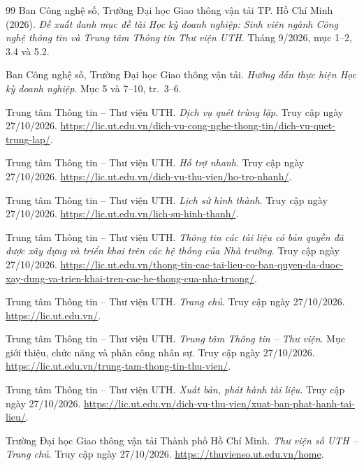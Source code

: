 \begin{thebibliography}{99}
Ban Công nghệ số, Trường Đại học Giao thông vận tải TP. Hồ Chí Minh (2026).
\textit{Đề xuất danh mục đề tài Học kỳ doanh nghiệp: Sinh viên ngành Công nghệ thông tin và Trung tâm Thông tin Thư viện UTH}.
Tháng 9/2026, mục 1--2, 3.4 và 5.2.

Ban Công nghệ số, Trường Đại học Giao thông vận tải.
\textit{Hướng dẫn thực hiện Học kỳ doanh nghiệp}.
Mục 5 và 7--10, tr.~3--6.

Trung tâm Thông tin -- Thư viện UTH.
\textit{Dịch vụ quét trùng lặp}.
Truy cập ngày 27/10/2026.
\url{https://lic.ut.edu.vn/dich-vu-cong-nghe-thong-tin/dich-vu-quet-trung-lap/}.

Trung tâm Thông tin -- Thư viện UTH.
\textit{Hỗ trợ nhanh}.
Truy cập ngày 27/10/2026.
\url{https://lic.ut.edu.vn/dich-vu-thu-vien/ho-tro-nhanh/}.

Trung tâm Thông tin -- Thư viện UTH.
\textit{Lịch sử hình thành}.
Truy cập ngày 27/10/2026.
\url{https://lic.ut.edu.vn/lich-su-hinh-thanh/}.

Trung tâm Thông tin -- Thư viện UTH.
\textit{Thông tin các tài liệu có bản quyền đã được xây dựng và triển khai trên các hệ thống của Nhà trường}.
Truy cập ngày 27/10/2026.
\url{https://lic.ut.edu.vn/thong-tin-cac-tai-lieu-co-ban-quyen-da-duoc-xay-dung-va-trien-khai-tren-cac-he-thong-cua-nha-truong/}.

Trung tâm Thông tin -- Thư viện UTH.
\textit{Trang chủ}.
Truy cập ngày 27/10/2026.
\url{https://lic.ut.edu.vn/}.

Trung tâm Thông tin -- Thư viện UTH.
\textit{Trung tâm Thông tin -- Thư viện}.
Mục giới thiệu, chức năng và phân công nhân sự.
Truy cập ngày 27/10/2026.
\url{https://lic.ut.edu.vn/trung-tam-thong-tin-thu-vien/}.

Trung tâm Thông tin -- Thư viện UTH.
\textit{Xuất bản, phát hành tài liệu}.
Truy cập ngày 27/10/2026.
\url{https://lic.ut.edu.vn/dich-vu-thu-vien/xuat-ban-phat-hanh-tai-lieu/}.

Trường Đại học Giao thông vận tải Thành phố Hồ Chí Minh.
\textit{Thư viện số UTH -- Trang chủ}.
Truy cập ngày 27/10/2026.
\url{https://thuvienso.ut.edu.vn/home}.
\end{thebibliography}
